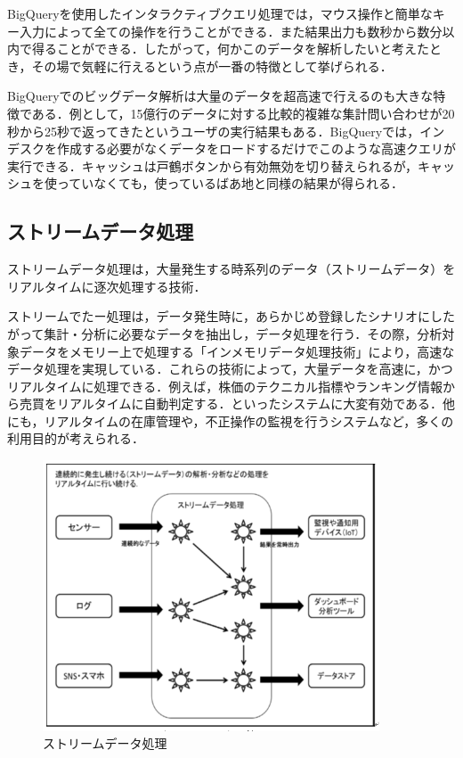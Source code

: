 BigQueryを使用したインタラクティブクエリ処理では，マウス操作と簡単なキー入力によって全ての操作を行うことができる．また結果出力も数秒から数分以内で得ることができる．したがって，何かこのデータを解析したいと考えたとき，その場で気軽に行えるという点が一番の特徴として挙げられる．

BigQueryでのビッグデータ解析は大量のデータを超高速で行えるのも大きな特徴である．例として，15億行のデータに対する比較的複雑な集計問い合わせが20秒から25秒で返ってきたというユーザの実行結果もある．BigQueryでは，インデスクを作成する必要がなくデータをロードするだけでこのような高速クエリが実行できる．キャッシュは戸鶴ボタンから有効無効を切り替えられるが，キャッシュを使っていなくても，使っているばあ地と同様の結果が得られる．\cite{bigquerystart}


\subsection{ストリームデータ処理}

ストリームデータ処理は，大量発生する時系列のデータ（ストリームデータ）をリアルタイムに逐次処理する技術．

ストリームでたー処理は，データ発生時に，あらかじめ登録したシナリオにしたがって集計・分析に必要なデータを抽出し，データ処理を行う．その際，分析対象データをメモリー上で処理する「インメモリデータ処理技術」により，高速なデータ処理を実現している．これらの技術によって，大量データを高速に，かつリアルタイムに処理できる．例えば，株価のテクニカル指標やランキング情報から売買をリアルタイムに自動判定する．といったシステムに大変有効である．他にも，リアルタイムの在庫管理や，不正操作の監視を行うシステムなど，多くの利用目的が考えられる．\cite{bigquerystart}

\begin{figure}[H]
\centering
\includegraphics[width=10cm]{streamdatasyori.png}
\caption{ストリームデータ処理}\label{サンプル図}
\end{figure}






